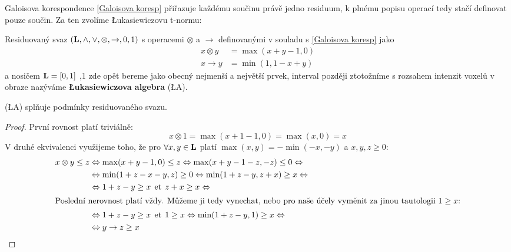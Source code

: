     Galoisova korespondence \eqref{Galoisova koresp} přiřazuje každému součinu právě jedno residuum, k plnému popisu operací tedy stačí definovat pouze součin. Za ten zvolíme \L ukasiewiczovu t-normu:

    \begin{define}\label{LA}
    Residuovaný svaz $(\mathbf{L},\wedge,\vee,\otimes,\rightarrow,0,1)$ s operacemi $\otimes$ a $\rightarrow$ definovanými v souladu s \eqref{Galoisova koresp} jako
    \begin{align}
    x \otimes y &= \max(x+y-1,0) \\
    x \rightarrow y &= \min(1,1-x+y)
    \end{align}
    a nosičem $\mathbf{L} = [0,1]$ ,1 zde opět bereme jako obecný nejmenší a největší prvek, interval později ztotožníme s rozsahem intenzit voxelů v obraze\rr {} nazýváme \textbf{\L ukasiewiczova algebra} \textup{(\L A)}.
    \end{define}
    
    \begin{theo}
      \textup{(\L A)} splňuje podmínky residuovaného svazu.
    \end{theo}
    \begin{proof}
    První rovnost platí triviálně:
      \[
      x \otimes 1 = \max(x+1-1,0) = \max(x,0) = x
      \]
    V druhé ekvivalenci využijeme toho, že pro $\forall x,y \in \mathbf{L}$ platí $\max(x,y) = -\min(-x,-y)$ a $x,y,z \geq 0$:  
    \begin{align*}
      x \otimes y \leq z &\Leftrightarrow \max(x+y-1,0) \leq z \Leftrightarrow \max(x+y-1-z,-z) \leq 0 \Leftrightarrow\\
      &\Leftrightarrow \min(1+z-x-y,z) \geq 0 \Leftrightarrow \min(1+z-y,z+x) \geq x \Leftrightarrow\\
      &\Leftrightarrow 1+z-y \geq x \;\,\mathrm{et}\;\, z+x \geq x \Leftrightarrow\\
    \intertext{Poslední nerovnost platí vždy. Můžeme ji tedy vynechat, nebo pro naše účely vyměnit za jinou tautologii $1 \geq x$:}
      &\Leftrightarrow 1+z-y \geq x \;\,\mathrm{et}\;\, 1 \geq x \Leftrightarrow \min(1+z-y,1) \geq x \Leftrightarrow\\
      &\Leftrightarrow y \rightarrow z \geq x
    \end{align*}
    \end{proof}


